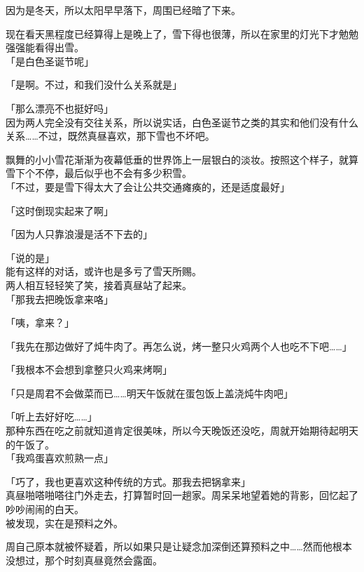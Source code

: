 因为是冬天，所以太阳早早落下，周围已经暗了下来。

现在看天黑程度已经算得上是晚上了，雪下得也很薄，所以在家里的灯光下才勉勉强强能看得出雪。\\

「是白色圣诞节呢」

「是啊。不过，和我们没什么关系就是」

「那么漂亮不也挺好吗」\\

因为两人完全没有交往关系，所以说实话，白色圣诞节之类的其实和他们没有什么关系……不过，既然真昼喜欢，那下雪也不坏吧。

飘舞的小小雪花渐渐为夜幕低垂的世界饰上一层银白的淡妆。按照这个样子，就算雪下个不停，最后似乎也不会有多少积雪。\\

「不过，要是雪下得太大了会让公共交通瘫痪的，还是适度最好」

「这时倒现实起来了啊」

「因为人只靠浪漫是活不下去的」

「说的是」\\

能有这样的对话，或许也是多亏了雪天所赐。\\

两人相互轻轻笑了笑，接着真昼站了起来。\\

「那我去把晚饭拿来咯」

「咦，拿来？」

「我先在那边做好了炖牛肉了。再怎么说，烤一整只火鸡两个人也吃不下吧……」

「我根本不会想到拿整只火鸡来烤啊」

「只是周君不会做菜而已……明天午饭就在蛋包饭上盖浇炖牛肉吧」

「听上去好好吃……」\\

那种东西在吃之前就知道肯定很美味，所以今天晚饭还没吃，周就开始期待起明天的午饭了。\\

「我鸡蛋喜欢煎熟一点」

「巧了，我也更喜欢这种传统的方式。那我去把锅拿来」\\

真昼啪嗒啪嗒往门外走去，打算暂时回一趟家。周呆呆地望着她的背影，回忆起了吵吵闹闹的白天。\\

被发现，实在是预料之外。

周自己原本就被怀疑着，所以如果只是让疑念加深倒还算预料之中……然而他根本没想过，那个时刻真昼竟然会露面。\\


